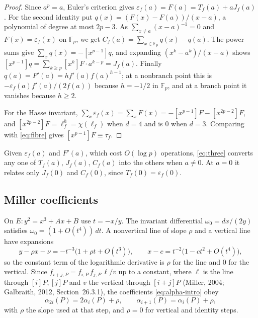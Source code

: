 \documentclass[11pt,a4paper]{article}
\numberwithin{equation}{section}
\theoremstyle{plain}
\theoremstyle{definition}
\newcommand{\F}{\mathbb{F}}
\newcommand{\eps}{\varepsilon}
\begin{document}
\begin{proof}
Since $a^p=a$, Euler's criterion gives $\eps_f(a)=F(a)=T_f(a)+aJ_f(a)$. For the second identity put $q(x)=(F(x)-F(a))/(x-a)$, a polynomial of degree at most $2p-3$. As $\sum_{x\neq a}(x-a)^{-1}=0$ and $F(x)=\eps_f(x)$ on $\F_p$, we get $C_f(a)=\sum_{x\in\F_p}q(x)-q(a)$. The power sums give $\sum_xq(x)=-[x^{p-1}]q$, and expanding $(x^k-a^k)/(x-a)$ shows $[x^{p-1}]q=\sum_{k\ge p}[x^k]F\cdot a^{k-p}=J_f(a)$. Finally $q(a)=F'(a)=hf'(a)f(a)^{h-1}$; at a nonbranch point this is $-\eps_f(a)f'(a)/(2f(a))$ because $h=-1/2$ in $\F_p$, and at a branch point it vanishes because $h\ge2$.

For the Hasse invariant, $\sum_x\eps_f(x)=\sum_xF(x)=-[x^{p-1}]F-[x^{2p-2}]F$, and $[x^{2p-2}]F=\ell_f^h=\chi(\ell_f)$ when $d=4$ and is $0$ when $d=3$. Comparing with \eqref{eq:fibre} gives $[x^{p-1}]F\equiv\tau_f$.
\end{proof}

Given $\eps_f(a)$ and $F'(a)$, which cost $O(\log p)$ operations, \eqref{eq:three} converts any one of $T_f(a)$, $J_f(a)$, $C_f(a)$ into the others when $a\neq0$. At $a=0$ it relates only $J_f(0)$ and $C_f(0)$, since $T_f(0)=\eps_f(0)$.

\subsection{Miller coefficients}\label{sec:miller}
On $E:y^2=x^3+Ax+B$ use $t=-x/y$. The invariant differential $\omega_0=dx/(2y)$ satisfies $\omega_0=(1+O(t^4))\,dt$. A nonvertical line of slope $\rho$ and a vertical line have expansions
\begin{equation}\label{eq:lines}
y-\rho x-\nu=-t^{-3}\bigl(1+\rho t+O(t^3)\bigr),\qquad x-c=t^{-2}\bigl(1-ct^2+O(t^4)\bigr),
\end{equation}
so the constant term of the logarithmic derivative is $\rho$ for the line and $0$ for the vertical. Since $f_{i+j,P}=f_{i,P}\,f_{j,P}\,\ell/v$ up to a constant, where $\ell$ is the line through $[i]P,[j]P$ and $v$ the vertical through $[i+j]P$ (Miller, 2004; Galbraith, 2012, Section~26.3.1), the coefficients \eqref{eq:alpha-intro} obey
\begin{equation}\label{eq:recurrence}
\alpha_{2i}(P)=2\alpha_i(P)+\rho,\qquad \alpha_{i+1}(P)=\alpha_i(P)+\rho ,
\end{equation}
with $\rho$ the slope used at that step, and $\rho=0$ for vertical and identity steps.
\end{document}
